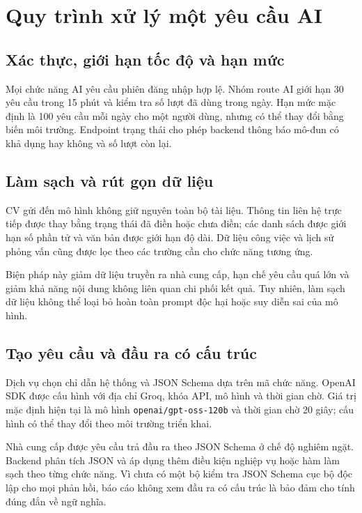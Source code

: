 \section{Quy trình xử lý một yêu cầu AI}

\subsection{Xác thực, giới hạn tốc độ và hạn mức}

Mọi chức năng AI yêu cầu phiên đăng nhập hợp lệ. Nhóm route AI giới hạn 30 yêu cầu trong 15 phút và kiểm tra số lượt đã dùng trong ngày. Hạn mức mặc định là 100 yêu cầu mỗi ngày cho một người dùng, nhưng có thể thay đổi bằng biến môi trường. Endpoint trạng thái cho phép backend thông báo mô-đun có khả dụng hay không và số lượt còn lại.

\subsection{Làm sạch và rút gọn dữ liệu}

CV gửi đến mô hình không giữ nguyên toàn bộ tài liệu. Thông tin liên hệ trực tiếp được thay bằng trạng thái đã điền hoặc chưa điền; các danh sách được giới hạn số phần tử và văn bản được giới hạn độ dài. Dữ liệu công việc và lịch sử phỏng vấn cũng được lọc theo các trường cần cho chức năng tương ứng.

Biện pháp này giảm dữ liệu truyền ra nhà cung cấp, hạn chế yêu cầu quá lớn và giảm khả năng nội dung không liên quan chi phối kết quả. Tuy nhiên, làm sạch dữ liệu không thể loại bỏ hoàn toàn prompt độc hại hoặc suy diễn sai của mô hình.

\subsection{Tạo yêu cầu và đầu ra có cấu trúc}

Dịch vụ chọn chỉ dẫn hệ thống và JSON Schema dựa trên mã chức năng. OpenAI SDK được cấu hình với địa chỉ Groq, khóa API, mô hình và thời gian chờ. Giá trị mặc định hiện tại là mô hình \texttt{openai/gpt-oss-120b} và thời gian chờ 20 giây; cấu hình có thể thay đổi theo môi trường triển khai.

Nhà cung cấp được yêu cầu trả đầu ra theo JSON Schema ở chế độ nghiêm ngặt. Backend phân tích JSON và áp dụng thêm điều kiện nghiệp vụ hoặc hàm làm sạch theo từng chức năng. Vì chưa có một bộ kiểm tra JSON Schema cục bộ độc lập cho mọi phản hồi, báo cáo không xem đầu ra có cấu trúc là bảo đảm cho tính đúng đắn về ngữ nghĩa.

